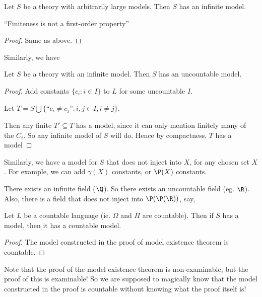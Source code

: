 \documentclass[a4paper]{article}
\begin{document}
\begin{cor}
  Let $S$ be a theory with arbitrarily large models. Then $S$ has an infinite model.

  ``Finiteness is not a first-order property''
\end{cor}

\begin{proof}
  Same as above.
\end{proof}

Similarly, we have
\begin{cor}
  Let $S$ be a theory with an infinite model. Then $S$ has an uncountable model.
\end{cor}

\begin{proof}
  Add constants $\{c_i: i\in I\}$ to $L$ for some uncountable $I$.

  Let $T = S\bigcup\{\text{``}c_i \not= c_j\text{''}: i, j\in I, i \not = j\}$.

  Then any finite $T' \subseteq T$ has a model, since it can only mention finitely many of the $C_i$. So any infinite model of $S$ will do. Hence by compactness, $T$ has a model
\end{proof}
Similarly, we have a model for $S$ that does not inject into $X$, for any chosen set $X$. For example, we can add $\gamma(X)$ constants, or $\P(X)$ constants.

\begin{eg}
  There exists an infinite field ($\Q$). So there exists an uncountable field (eg. $\R$). Also, there is a field that does not inject into $\P(\P(\R))$, say,
\end{eg}

\begin{thm}
  Let $L$ be a countable language (ie. $\Omega$ and $\Pi$ are countable). Then if $S$ has a model, then it has a countable model.
\end{thm}

\begin{proof}
  The model constructed in the proof of model existence theorem is countable.
\end{proof}
Note that the proof of the model existence theorem is non-examinable, but the proof of this is examinable! So we are supposed to magically know that the model constructed in the proof is countable without knowing what the proof itself is!
\end{document}
